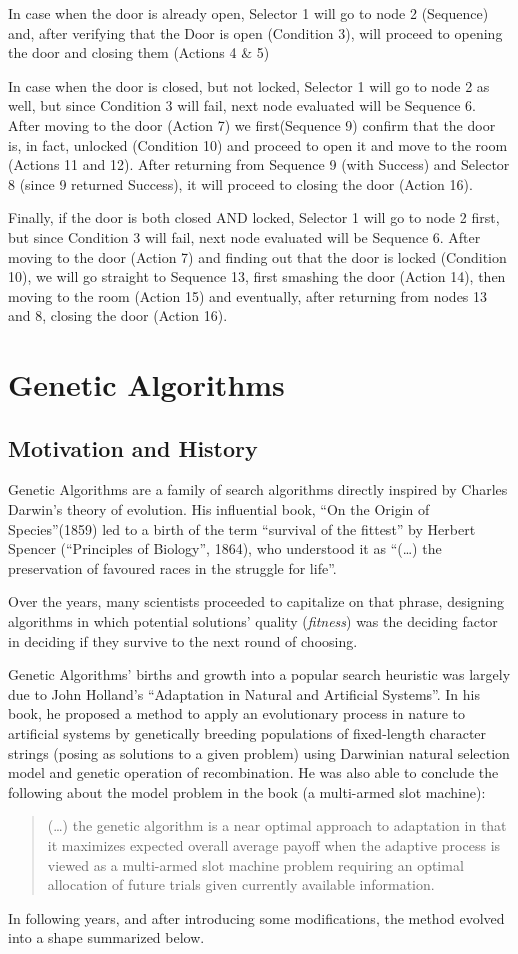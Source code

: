 In case when the door is already open, Selector 1 will go to node 2 (Sequence) and, after verifying that the Door is open (Condition 3), will proceed to opening the door and closing them (Actions 4 \& 5)

In case when the door is closed, but not locked, Selector 1 will go to node 2 as well, but since Condition 3 will fail, next node evaluated will be Sequence 6. After moving to the door (Action 7) we first(Sequence 9) confirm that the door is, in fact, unlocked (Condition 10) and proceed to open it and move to the room (Actions 11 and 12). After returning from Sequence 9 (with Success) and Selector 8 (since 9 returned Success), it will proceed to closing the door (Action 16).

Finally, if the door is both closed AND locked, Selector 1 will go to node 2 first, but since Condition 3 will fail, next node evaluated will be Sequence 6. After moving to the door (Action 7) and finding out that the door is locked (Condition 10), we will go straight to Sequence 13, first smashing the door (Action 14), then moving to the room (Action 15) and eventually, after returning from nodes 13 and 8, closing the door (Action 16).
\section{Genetic Algorithms}
\subsection{Motivation and History}
Genetic Algorithms are a family of search algorithms directly inspired by Charles Darwin’s theory of evolution. His influential book, ``On the Origin of Species''(1859) led to a birth of the term ``survival of the fittest'' by Herbert Spencer (``Principles of Biology'', 1864), who understood it as \enquote{(\ldots) the preservation of favoured races in the struggle for life}.

Over the years, many scientists proceeded to capitalize on that phrase, designing algorithms in which potential solutions' quality (\textit{fitness}) was the deciding factor in deciding if they survive to the next round of choosing. %

Genetic Algorithms' births and growth into a popular search heuristic was largely due to John Holland's ``Adaptation in Natural and Artificial Systems''. In his book, he proposed a method to apply an evolutionary process in nature to artificial systems by genetically breeding populations of fixed-length character strings (posing as solutions to a given problem) using Darwinian natural selection model and genetic operation of recombination. He was also able to conclude the following about the model problem in the book (a multi-armed slot machine)\cite{kozagp}:
\begin{quote}
   (\ldots) the genetic algorithm is a near optimal approach to adaptation in that it maximizes expected overall average payoff when the adaptive process is viewed as a multi-armed slot machine problem requiring an optimal allocation of future trials given currently available information.
\end{quote}
In following years, and after introducing some modifications, the method evolved into a shape summarized below.
